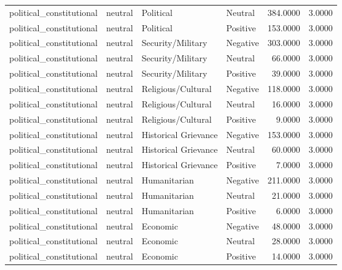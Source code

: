 \begin{longtable}{llllrr}
political\_constitutional & neutral & Political & Neutral & 384.0000 & 3.0000 \\
political\_constitutional & neutral & Political & Positive & 153.0000 & 3.0000 \\
political\_constitutional & neutral & Security/Military & Negative & 303.0000 & 3.0000 \\
political\_constitutional & neutral & Security/Military & Neutral & 66.0000 & 3.0000 \\
political\_constitutional & neutral & Security/Military & Positive & 39.0000 & 3.0000 \\
political\_constitutional & neutral & Religious/Cultural & Negative & 118.0000 & 3.0000 \\
political\_constitutional & neutral & Religious/Cultural & Neutral & 16.0000 & 3.0000 \\
political\_constitutional & neutral & Religious/Cultural & Positive & 9.0000 & 3.0000 \\
political\_constitutional & neutral & Historical Grievance & Negative & 153.0000 & 3.0000 \\
political\_constitutional & neutral & Historical Grievance & Neutral & 60.0000 & 3.0000 \\
political\_constitutional & neutral & Historical Grievance & Positive & 7.0000 & 3.0000 \\
political\_constitutional & neutral & Humanitarian & Negative & 211.0000 & 3.0000 \\
political\_constitutional & neutral & Humanitarian & Neutral & 21.0000 & 3.0000 \\
political\_constitutional & neutral & Humanitarian & Positive & 6.0000 & 3.0000 \\
political\_constitutional & neutral & Economic & Negative & 48.0000 & 3.0000 \\
political\_constitutional & neutral & Economic & Neutral & 28.0000 & 3.0000 \\
political\_constitutional & neutral & Economic & Positive & 14.0000 & 3.0000 \\
\end{longtable}
